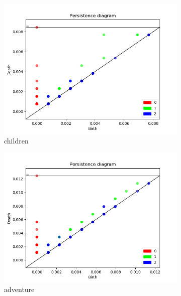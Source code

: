 \documentclass[fleqn]{article}
\begin{document}
\begin{figure}
\begin{subfigure}[t]{0.425\textwidth}
    	\includegraphics[width=\textwidth]{figures/stopwords_excluded/children.png}
    	\caption{children}
        \label{fig:sw:children}
    \end{subfigure}\hfill
	\begin{subfigure}[t]{0.425\textwidth}
    	\includegraphics[width=\textwidth]{figures/stopwords_excluded/adventure.png}
    	\caption{adventure}
        \label{fig:sw:adventure}
    \end{subfigure}\hfill
    \\
	\begin{subfigure}[t]{0.425\textwidth}

\end{subfigure}
\end{figure}
\end{document}
